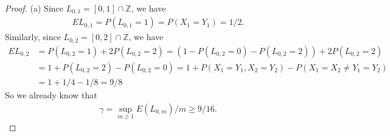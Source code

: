 \documentclass[12pt,a4paper]{amsart}
\theoremstyle{plain}
\theoremstyle{definition}
\theoremstyle{remark}
\numberwithin{equation}{section}
\begin{document}
\begin{proof}
(a) Since $L_{0,1} = [0,1] \cap \mathbb Z$, we have
\begin{align}
E L_{0,1} 
= P(L_{0,1} = 1) 
= P(X_1 = Y_1)
= 1/2.
\end{align}
Similarly, since $L_{0,2} = [0,2]\cap \mathbb Z$, we have
\begin{align}
E L_{0,2}
& = P(L_{0,2} = 1) + 2P(L_{0,2} = 2)
= \left( 1- P(L_{0,2} = 0) - P(L_{0,2} = 2) \right) + 2 P(L_{0,2} = 2)
\\&= 1 + P(L_{0,2} = 2) - P(L_{0,2} = 0)
= 1+ P(X_1=Y_1, X_2= Y_2) - P(X_1 = X_2 \neq Y_1 = Y_2)
\\& = 1 + 1/4 - 1/8 
= 9/8
\end{align} 
So we already know that 
\begin{align}
\gamma = \sup_{m\geq 1} E(L_{0,m})/m \geq 9/16.
\end{align}


\end{proof}
\end{document}
